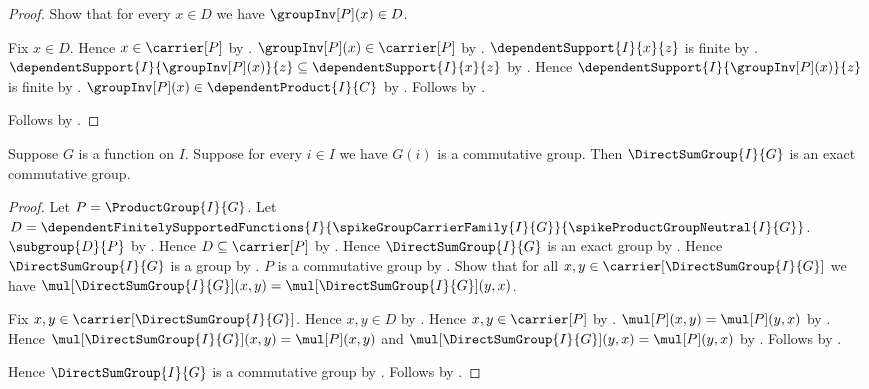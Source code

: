 \begin{proof}
    Show that for every $x\in D$ we have $\groupInv[P](x)\in D$.
    \begin{subproof}
        Fix $x\in D$.
        Hence $x\in\carrier[P]$ by .
        $\groupInv[P](x)\in\carrier[P]$ by
            .
        $\dependentSupport{I}{x}{z}$ is finite by
            .
        $\dependentSupport{I}{\groupInv[P](x)}{z}
            \subseteq\dependentSupport{I}{x}{z}$ by
            .
        Hence $\dependentSupport{I}{\groupInv[P](x)}{z}$ is finite by
            .
        $\groupInv[P](x)\in\dependentProduct{I}{C}$ by \auto.
        Follows by
            .
    \end{subproof}
    Follows by .
\end{proof}

\begin{theorem}\label{spike_direct_sum_group_is_exact}
    Suppose $G$ is a function on $I$.
    Suppose for every $i\in I$ we have $G(i)$ is a commutative group.
    Then $\DirectSumGroup{I}{G}$ is an exact commutative group.
\end{theorem}
\begin{proof}
    Let $P=\ProductGroup{I}{G}$.
    Let $D=\dependentFinitelySupportedFunctions
        {I}{\spikeGroupCarrierFamily{I}{G}}{
            \spikeProductGroupNeutral{I}{G}}$.
    $\subgroup{D}{P}$ by .
    Hence $D\subseteq\carrier[P]$ by .
    Hence $\DirectSumGroup{I}{G}$ is an exact group by
        .
    Hence $\DirectSumGroup{I}{G}$ is a group by \auto.
    $P$ is a commutative group by
        .
    Show that for all $x,y\in\carrier[\DirectSumGroup{I}{G}]$ we have
        $\mul[\DirectSumGroup{I}{G}](x,y)
            =\mul[\DirectSumGroup{I}{G}](y,x)$.
    \begin{subproof}
        Fix $x,y\in\carrier[\DirectSumGroup{I}{G}]$.
        Hence $x,y\in D$ by
            .
        Hence $x,y\in\carrier[P]$ by .
        $\mul[P](x,y)=\mul[P](y,x)$ by
            .
        Hence
            $\mul[\DirectSumGroup{I}{G}](x,y)=\mul[P](x,y)$ and
            $\mul[\DirectSumGroup{I}{G}](y,x)=\mul[P](y,x)$ by
            .
        Follows by \auto.
    \end{subproof}
    Hence $\DirectSumGroup{I}{G}$ is a commutative group by
        .
    Follows by \auto.
\end{proof}

